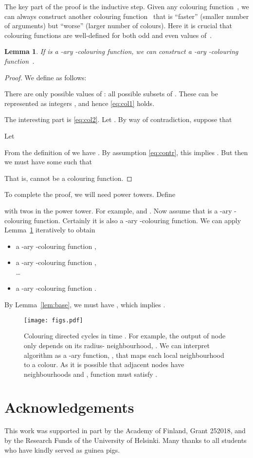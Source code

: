 \documentclass[11pt,a4paper]{article}
\newtheorem{lemma}{Lemma}
\begin{document}
The key part of the proof is the inductive step. Given any colouring function~, we can always construct another colouring function~ that is ``faster'' (smaller number of arguments) but ``worse'' (larger number of colours). Here it is crucial that colouring functions are well-defined for both odd and even values of~.

\begin{lemma}\label{lem:ind}
    If  is a -ary -colouring function, we can construct a -ary -colouring function~.
\end{lemma}
\begin{proof}
    We define  as follows:
    
    There are only  possible values of : all possible subsets of . These can be represented as integers , and hence \eqref{eq:col1} holds.

    The interesting part is \eqref{eq:col2}. Let . By way of contradiction, suppose that
    
    Let
    
    From the definition of  we have
    .
    By assumption \eqref{eq:contr}, this implies
    .
    But then we must have some  such that
    
    That is,  cannot be a colouring function.
\end{proof}

To complete the proof, we will need power towers. Define

with  twos in the power tower. For example,  and . Now assume that  is a -ary -colouring function. Certainly it is also a -ary -colouring function. We can apply Lemma~\ref{lem:ind} iteratively to obtain
\begin{itemize}[noitemsep]
    \item a -ary -colouring function ,
    \item a -ary -colouring function , \\ \ldots
    \item a -ary -colouring function .
\end{itemize}
By Lemma~\ref{lem:base}, we must have , which implies .

\begin{figure}[b]
    \centering
    \texttt{[image: figs.pdf]}
    \caption{Colouring directed cycles in time . For example, the output of node  only depends on its radius- neighbourhood, . We can interpret algorithm  as a -ary function, , that maps each local neighbourhood to a colour. As it is possible that adjacent nodes have neighbourhoods  and , function  must satisfy .}\label{fig:A}
\end{figure}

\section*{Acknowledgements}

This work was supported in part by the Academy of Finland, Grant 252018, and by the Research Funds of the University of Helsinki. Many thanks to all students who have kindly served as guinea pigs.


\def\UrlFont{\sf\footnotesize}
\setlength{\bibsep}{3pt}


\end{document}
